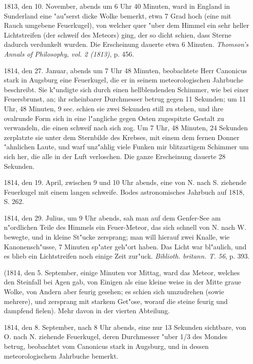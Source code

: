 \documentclass[a4paper, 11pt, oneside, polutonikogreek, german]{article}
\begin{document}
1813, den 10. November, abends um 6 Uhr 40 Minuten, ward in England in Sunderland eine "au"serst dicke Wolke bemerkt, etwa 7 Grad hoch (eine mit Rauch umgebene Feuerkugel), von welcher quer "uber dem Himmel ein sehr heller Lichtstreifen (der schweif des Meteors) ging, der so dicht schien, dass Sterne dadurch verdunkelt wurden. Die Erscheinung dauerte etwa 6 Minuten. \emph{Thomson's Annals of Philosophy, vol. 2 (1813)}, p. 456.

1814, den 27. Januar, abends um 7 Uhr 48 Minuten, beobachtete Herr Canonicus stark in Augsburg eine Feuerkugel, die er in seinem meteorologischen Jahrbuche beschreibt. Sie k"undigte sich durch einen hellblendenden Schimmer, wie bei einer Feuersbrunst, an; ihr scheinbarer Durchmesser betrug gegen 11 Sekunden; um 11 Uhr, 48 Minuten, 9 sec. schien sie zwei Sekunden still zu stehen, und ihre ovalrunde Form sich in eine l"angliche gegen Osten zugespitzte Gestalt zu verwandeln, die einen schweif nach sich zog. Um 7 Uhr, 48 Minuten, 24 Sekunden zerplatzte sie unter dem Sternbilde des Krebses, mit einem dem fernen Donner "ahnlichen Laute, und warf unz"ahlig viele Funken mir blitzartigem Schimmer um sich her, die alle in der Luft verloschen. Die ganze Erscheinung dauerte 28 Sekunden.

1814, den 19. April, zwischen 9 und 10 Uhr abends, eine von N. nach S. ziehende Feuerkugel mit einem langen schweife. Bodes astronomisches Jahrbuch auf 1818, S. 262.

1814, den 29. Julius, um 9 Uhr abends, sah man auf dem Genfer-See am n"ordlichen Teile des Himmels ein Feuer-Meteor, das sich schnell von N. nach W. bewegte, und in kleine St"ucke zersprang; man will hierauf zwei Knalle, wie Kanonensch"usse, 7 Minuten sp"ater geh"ort haben. Das Licht war bl"aulich, und es blieb ein Lichtstreifen noch einige Zeit zur"uck. \emph{Biblioth. britann. T. 56}, p. 393.

(1814, den 5. September, einige Minuten vor Mittag, ward das Meteor, welches den Steinfall bei Agen gab, von Einigen als eine kleine weise in der Mitte graue Wolke, von Andern aber feurig gesehen; es schien sich umzudrehen (sowie mehrere), und zersprang mit starkem Get"ose, worauf die steine feurig und dampfend fielen). Mehr davon in der vierten Abteilung.

1814, den 8. September, nach 8 Uhr abends, eine nur 13 Sekunden sichtbare, von O. nach N. ziehende Feuerkugel, deren Durchmesser "uber 1/3 des Mondes betrug, beobachtet vom Canonicus stark in Augsburg, und in dessen meteorologischem Jahrbuche bemerkt.
\end{document}
